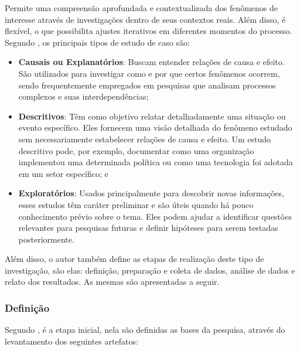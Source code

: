 Permite uma compreensão aprofundada e contextualizada dos fenômenos de interesse através de investigações dentro de seus contextos reais. Além disso, é flexível, o que possibilita ajustes iterativos em diferentes momentos do processo. Segundo , os principais tipos de estudo de caso são:

\begin{itemize}
    \item \textbf{Causais ou Explanatórios}: Buscam entender relações de causa e efeito. São utilizados para investigar como e por que certos fenômenos ocorrem, sendo frequentemente empregados em pesquisas que analisam processos complexos e suas interdependências;
    
    \item \textbf{Descritivos}: Têm como objetivo relatar detalhadamente uma situação ou evento específico. Eles fornecem uma visão detalhada do fenômeno estudado sem necessariamente estabelecer relações de causa e efeito. Um estudo descritivo pode, por exemplo, documentar como uma organização implementou uma determinada política ou como uma tecnologia foi adotada em um setor específico; e
    
    \item \textbf{Exploratórios}: Usados principalmente para descobrir novas informações, esses estudos têm caráter preliminar e são úteis quando há pouco conhecimento prévio sobre o tema. Eles podem ajudar a identificar questões relevantes para pesquisas futuras e definir hipóteses para serem testadas posteriormente.
\end{itemize}


Além disso, o autor também define as etapas de realização deste tipo de investigação, são elas: definição, preparação e coleta de dados, análise de dados e relato dos resultados. As mesmas são apresentadas a seguir.

\subsubsection{Definição}

Segundo , é a etapa inicial, nela são definidas as bases da pesquisa, através do levantamento dos seguintes artefatos:


